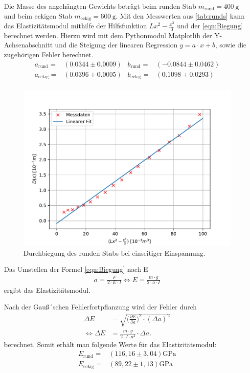 \bigskip
Die Masse des angehängten Gewichts beträgt beim runden Stab $m_{\text{rund}}=\qty{400}{\g}$ und beim eckigen Stab $m_{\text{eckig}}=\qty{600}{\g}$. Mit den Messwerten aus \autoref{tab:runds}
kann das Elastizitätsmodul mithilfe der Hilfsfunktion $Lx^2-\frac{x^3}{3}$ und der \autoref{eqn:Biegung} berechnet werden.
Hierzu wird mit dem Pythonmodul Matplotlib \cite{matplotlib} der Y-Achsenabschnitt und die Steigung der linearen Regression $y = a \cdot x + b$, 
sowie die zugehörigen Fehler berechnet.\\
\begin{align*}
  a_{\text{rund}} =&(0.0344 ± 0.0009) & b_{\text{rund}}=& (-0.0844 ± 0.0462)\\
  a_{\text{eckig}} =&(0.0396 ± 0.0005) & b_{\text{eckig}}=& (0.1098 ± 0.0293)\\
 \end{align*}
\begin{figure}[!htb]
  \centering
  \includegraphics[scale=0.75]{content/plots/runde.pdf}
  \caption{Durchbiegung des runden Stabs bei einseitiger Einspannung.}
  \label{fig:LinRegrunde}
\end{figure}
Das Umstellen der Formel \autoref{eqn:Biegung} nach E 
\begin{align}
    a = \frac{F}{2 \cdot E \cdot I} \iff E =\frac{m \cdot g}{2 \cdot a \cdot I}\label{eqn:Elamodul.1}
\end{align}
ergibt das Elastizitätsmodul.

Nach der Gauß´schen Fehlerfortpflanzung wird der Fehler durch
\begin{equation*}
  \begin{aligned}
  \Delta E &= \sqrt{\biggl(\frac{\partial E}{\partial a}\biggr)^2\cdot (\Delta a)^2} \\
  \iff \Delta E &= \frac{m\cdot g}{2\cdot I \cdot a^2} \cdot \Delta a.
  \label{eqn:e-fehler-ein}
  \end{aligned}
  \end{equation*}
berechnet.
Somit erhält man folgende Werte für das Elastizitätsmodul:
\begin{align*}
  E_{\text{rund}}=&(116,16\pm3,04)\si{\giga\pascal}\\
  E_{\text{eckig}}=&(89,22\pm1,13)\si{\giga\pascal}\\
  \label{eqn:Eein} 
\end{align*}

